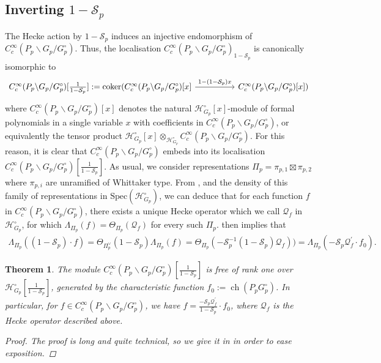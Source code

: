 \documentclass{amsart}%
\theoremstyle{plain}
\newtheorem{thm}{Theorem}[subsection]
\theoremstyle{plain}
\theoremstyle{remark}
\DeclareMathOperator{\ch}{ch}
\begin{document}
\subsection{Inverting $1-\mathcal{S}_p$}\label{sec inverting} The Hecke action by $1-\mathcal{S}_p$ induces an injective endomorphism of $C_c^\infty(P_p\backslash G_p/G_p^\circ)$. Thus, the localisation $C_c^\infty(P_p\backslash G_p/G_p^\circ)_{1-\mathcal{S}_p}$ is canonically isomorphic to \[\begin{tikzcd}[ampersand replacement=\&]
	{C_c^\infty(P_p\backslash G_p/G_p^\circ)[\tfrac{1}{1-\mathcal{S}_p}]:=\mathrm{coker}(C_c^\infty(P_p\backslash G_p/G_p^\circ)[x]} \&\& {C_c^\infty(P_p\backslash G_p/G_p^\circ)[x])}
	\arrow["{1-(1-\mathcal{S}_p)x}", from=1-1, to=1-3]
\end{tikzcd}\]
where $C_c^\infty(P_p\backslash G_p/G_p^\circ)[x]$ denotes the natural $\mathcal{H}_{G_p}^\circ[x]$-module of formal polynomials in a single variable $x$ with coefficients in $C_c^\infty(P_p\backslash G_p/G_p^\circ)$, or equivalently the tensor product $\mathcal{H}_{G_p}^\circ[x]\otimes_{\mathcal{H}_{G_p}^\circ} C_c^\infty(P_p\backslash G_p/G_p^\circ)$. For this reason, it is clear that $C_c^\infty(P_p\backslash G_p/G_p^\circ)$ embeds into its localisation $C_c^\infty(P_p\backslash G_p/G_p^\circ)[\tfrac{1}{1-\mathcal{S}_p}]$. As usual, we consider representations $\Pi_p=\pi_{p,1}\boxtimes\pi_{p,2}$ where $\pi_{p,i}$ are unramified of Whittaker type. From , and the density of this family of representations in $\mathrm{Spec}(\mathcal{H}_{G_p}^\circ)$, we can deduce that for each function $f$ in $C_c^\infty(P_p\backslash G_p/G_p^\circ)$, there exists a unique Hecke operator which we call $\mathcal{Q}_f$ in $\mathcal{H}_{G_p}^\circ$, for which $\Lambda_{\Pi_p}(f)=\Theta_{\Pi_p}(\mathcal{Q}_f)$ for every such $\Pi_p$.  then implies that \begin{align}\label{eq: inverting}\Lambda_{\Pi_p}((1-\mathcal{S}_p)\cdot f)=\Theta_{\Pi_p^\vee}(1-\mathcal{S}_p)\Lambda_{\Pi_p}(f)=\Theta_{\Pi_p}(-\mathcal{S}_p^{-1}(1-\mathcal{S}_p)\mathcal{Q}_f))=\Lambda_{\Pi_p}(-\mathcal{S}_p\mathcal{Q}_f^{'}\cdot f_0).\end{align}
\begin{thm}\label{thm freeness of P-invariant vectors}
    The module $C_c^\infty(P_p\backslash G_p/G_p^\circ)[\tfrac{1}{1-\mathcal{S}_p}]$ is free of rank one over $\mathcal{H}_{G_p}^\circ[\tfrac{1}{1-\mathcal{S}_p}]$, generated by the characteristic function $f_0:=\ch(P_pG_p^\circ)$. In particular, for $f\in C_c^\infty(P_p\backslash G_p/G_p^\circ)$, we have $f=\tfrac{-\mathcal{S}_p\mathcal{Q}_f^{'}}{1-\mathcal{S}_p}\cdot f_0$, where $\mathcal{Q}_f$ is the Hecke operator described above.
    \begin{proof} The proof is long and quite technical, so we give it in  in order to ease exposition.
    \end{proof}
\end{thm}
\end{document}
